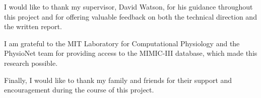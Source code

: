 I would like to thank my supervisor, David Watson, for his guidance throughout this project and for offering valuable feedback on both the technical direction and the written report.

I am grateful to the MIT Laboratory for Computational Physiology and the PhysioNet team for providing access to the MIMIC-III database, which made this research possible.

Finally, I would like to thank my family and friends for their support and encouragement during the course of this project.
